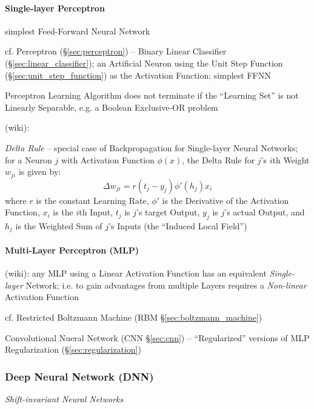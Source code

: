 \paragraph{Single-layer Perceptron}\label{sec:single_layer_perceptron}\hfill

simplest Feed-Forward Neural Network

cf. Perceptron (\S\ref{sec:perceptron}) -- Binary Linear Classifier
(\S\ref{sec:linear_classifier}); an Artificial Neuron using the Unit Step
Function (\S\ref{sec:unit_step_function}) as the Activation Function; simplest
FFNN

Perceptron Learning Algorithm does not terminate if the ``Learning Set'' is not
Linearly Separable, e.g. a Boolean Exclusive-OR problem

(wiki):

\emph{Delta Rule} -- special case of Backpropagation for Single-layer Neural
Networks; for a Neuron $j$ with Activation Function $\phi(x)$, the Delta Rule
for $j$'s $i$th Weight $w_{ji}$ is given by:
\[
  \Delta w_{ji} = r(t_j - y_j) \phi'(h_j) x_i
\]
where $r$ is the constant Learning Rate, $\phi'$ is the Derivative of the
Activation Function, $x_i$ is the $i$th Input, $t_j$ is $j$'s target Output,
$y_j$ is $j$'s actual Output, and $h_j$ is the Weighted Sum of $j$'s Inputs (the
``Induced Local Field'')



\paragraph{Multi-Layer Perceptron (MLP)}\label{sec:mlp}\hfill

(wiki): any MLP using a Linear Activation Function has an equivalent
\emph{Single-layer} Network; i.e. to gain advantages from multiple Layers
requires a \emph{Non-linear} Activation Function

cf. Restricted Boltzmann Machine (RBM \S\ref{sec:boltzmann_machine})

\fist Convolutional Nueral Network (CNN \S\ref{sec:cnn}) -- ``Regularized''
versions of MLP \fist Regularization (\S\ref{sec:regularization})



\subsubsection{Deep Neural Network (DNN)}\label{sec:dnn}

\emph{Shift-invariant Neural Networks}

